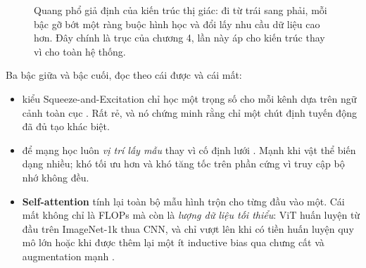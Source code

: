 \documentclass[../../deep_learning.tex]{subfiles}
\begin{document}
\begin{figure}[H]\centering
{}
\caption{Quang phổ giả định của kiến trúc thị giác: đi từ trái sang phải, mỗi bậc gỡ bớt một ràng buộc hình học và đổi lấy nhu cầu dữ liệu cao hơn. Đây chính là trục của chương 4, lần này áp cho kiến trúc thay vì cho toàn hệ thống.}
\label{fig:quang-pho-gia-dinh}
\end{figure}

Ba bậc giữa và bậc cuối, đọc theo cái được và cái mất:

\begin{itemize}
\item \textbf{} kiểu Squeeze-and-Excitation chỉ học một trọng số cho mỗi kênh dựa trên ngữ cảnh toàn cục \cite{hu2018senet}. Rất rẻ, và nó chứng minh rằng chỉ một chút định tuyến động đã đủ tạo khác biệt.
\item \textbf{} để mạng học luôn \emph{vị trí lấy mẫu} thay vì cố định lưới \cite{dai2017deformable}. Mạnh khi vật thể biến dạng nhiều; khó tối ưu hơn và khó tăng tốc trên phần cứng vì truy cập bộ nhớ không đều.
\item \textbf{Self-attention} tính lại toàn bộ mẫu hình trộn cho từng đầu vào một. Cái mất không chỉ là FLOPs mà còn là \emph{lượng dữ liệu tối thiểu}: ViT huấn luyện từ đầu trên ImageNet-1k thua CNN, và chỉ vượt lên khi có tiền huấn luyện quy mô lớn hoặc khi được thêm lại một ít inductive bias qua chưng cất và augmentation mạnh \cite{dosovitskiy2021vit, touvron2021deit}.
\end{itemize}
\end{document}
